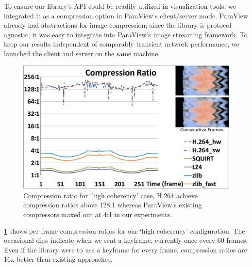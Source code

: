 \documentclass[review]{vgtc}                 %
\begin{document}

To ensure our library's API could be readily utilized in visualization
tools, we integrated it as a compression option in ParaView's
client/server mode.  ParaView already had abstractions for image
compression; since the library is protocol agnostic, it was easy to
integrate into ParaView's image streaming framework.  To keep our
results independent of comparably transient network performance, we
launched the client and server on the same machine.


\begin{figure}[htb]
  \centering
  \includegraphics[width=\columnwidth]{compressRatio.eps}
  \caption{Compression ratio for `high coherency' case.
	H.264 achieve compression ratios above 128:1 whereas ParaView's existing
	compressors maxed out at 4:1 in our experiments.}
  \label{fig:compressRatio}
\end{figure}

\cref{fig:compressRatio} shows per-frame compression ratios for our
`high coherency' configuration.  The occasional dips indicate when we
sent a keyframe, currently once every 60 frames.  Even if the library
were to use a keyframe for every frame, compression ratios are 16x
better than existing approaches.
\end{document}
